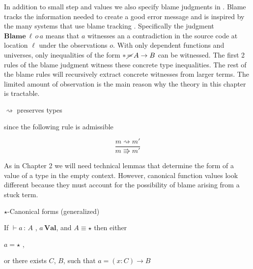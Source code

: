 In addition to small step and values we also specify blame judgments in .
Blame tracks the information needed to create a good error message and is inspired by the many systems that use blame tracking \cite{10.1145/581478.581484,10.1007/978-3-642-00590-9_1,wadler:LIPIcs:2015:5033}.
Specifically the judgment $\textbf{Blame}\:\ensuremath{\ell}\,o\,a$ means that $a$ witnesses an a contradiction in the source code at location $\ensuremath{\ell}$ under the observations $o$.
With only dependent functions and universes, only inequalities of the form $*\,\cancel{=}\,A\rightarrow B$ can be witnessed.
The first 2 rules of the blame judgment witness these concrete type inequalities.
The rest of the blame rules will recursively extract concrete witnesses from larger terms.
The limited amount of observation is the main reason why the theory in this chapter is tractable.
\begin{fact}
$\rightsquigarrow$ preserves types 

since the following rule is admissible
\end{fact}

\[
\frac{m\rightsquigarrow m'}{m\Rrightarrow m'}
\]

As in Chapter 2 we will need technical lemmas that determine the form of a value of a type in the empty context.
However, canonical function values look different because they must account for the possibility of blame arising from a stuck term.
\begin{lem}
$\star$-Canonical forms (generalized)

If $\vdash a\,:\,A$ , $a\,\textbf{Val}$, and $A\equiv\star$ then
either

\textup{$a=\star$ ,}

\textup{or there exists $C$, $B$, such that $a=\left(x:C\right)\rightarrow B$}
\end{lem}

